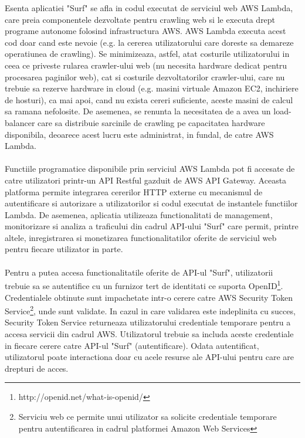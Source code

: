 \newcommand{\AWSSTS}{Serviciu web ce permite unui utilizator sa solicite credentiale temporare pentru autentificarea in cadrul platformei Amazon Web Services}
\newcommand{\openIDDefinition}{http://openid.net/what-is-openid/}


Esenta aplicatiei "Surf" se afla in codul executat de serviciul web AWS Lambda, care preia componentele dezvoltate pentru crawling web si le executa drept programe autonome folosind infrastructura AWS. AWS Lambda executa acest cod doar cand este nevoie (e.g. la cererea utilizatorului care doreste sa demareze operatiunea de crawling). Se minimizeaza, astfel, atat costurile utilizatorului in ceea ce priveste rularea crawler-ului web (nu necesita hardware dedicat pentru procesarea paginilor web), cat si costurile dezvoltatorilor crawler-ului, care nu trebuie sa rezerve hardware in cloud (e.g. masini virtuale Amazon EC2, inchiriere de hosturi), ca mai apoi, cand nu exista cereri suficiente, aceste masini de calcul sa ramana nefolosite. De asemenea, se renunta la necesitatea de a avea un load-balancer care sa distribuie sarcinile de crawling pe capacitatea hardware disponibila, deoarece acest lucru este administrat, in fundal, de catre AWS Lambda.
\\
\\
Functiile programatice disponibile prin serviciul AWS Lambda pot fi accesate de catre utilizatori printr-un API Restful gazduit de AWS API Gateway. Aceasta platforma permite integrarea cererilor HTTP externe cu mecanismul de autentificare si autorizare a utilizatorilor si codul executat de instantele functiilor Lambda. De asemenea, aplicatia utilizeaza functionalitati de management, monitorizare si analiza a traficului din cadrul API-ului "Surf" care permit, printre altele, inregistrarea si monetizarea functionalitatilor oferite de serviciul web pentru fiecare utilizator in parte. 
\\
\\
Pentru a putea accesa functionalitatile oferite de API-ul "Surf", utilizatorii trebuie sa se autentifice cu un furnizor tert de identitati ce suporta OpenID\footnote{\openIDDefinition}. Credentialele obtinute sunt impachetate intr-o cerere catre AWS Security Token Service\footnote{\AWSSTS}, unde sunt validate. In cazul in care validarea este indeplinita cu succes, Security Token Service returneaza utilizatorului credentiale temporare pentru a accesa servicii din cadrul AWS. Utilizatorul trebuie sa includa aceste credentiale in fiecare cerere catre API-ul "Surf" (autentificare). Odata autentificat, utilizatorul poate interactiona doar cu acele resurse ale API-ului pentru care are drepturi de acces. 
\newpage


